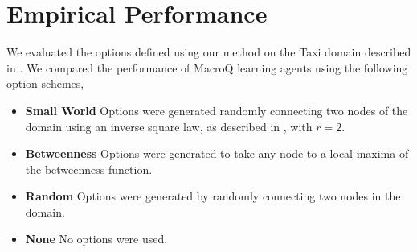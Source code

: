 \section{Empirical Performance}
\label{sec:experiments}

We evaluated the options defined using our method on the Taxi domain
described in . We compared the performance of
MacroQ learning agents using the following option schemes,
\begin{itemize}
   \item \textbf{Small World} Options were generated randomly connecting two nodes of
       the domain using an inverse square law, as described in
       , with $r = 2$.
   \item \textbf{Betweenness} Options were generated to take any node to a local maxima
       of the betweenness function.
   \item \textbf{Random} Options were generated by randomly connecting two nodes in the
       domain.
   \item \textbf{None} No options were used.
\end{itemize}


